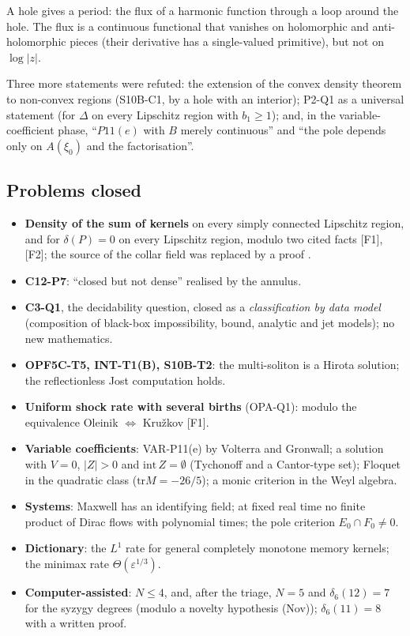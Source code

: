 \begin{intuition}
A hole gives a period: the flux of a harmonic function through a loop around the hole. The flux is a continuous functional that vanishes on holomorphic and anti-holomorphic pieces (their derivative has a single-valued primitive), but not on $\log|z|$.
\end{intuition}

Three more statements were refuted: the extension of the convex density theorem to non-convex regions (S10B-C1, by a hole with an interior); P2-Q1 as a universal statement (for $\Delta$ on every Lipschitz region with $b_1\ge1$); and, in the variable-coefficient phase, ``$P11(e)$ with $B$ merely continuous'' and ``the pole depends only on $A(\xi_0)$ and the factorisation''.

\subsection{Problems closed}

\begin{itemize}
\item \textbf{Density of the sum of kernels} on every simply connected Lipschitz region, and for $\delta(P)=0$ on every Lipschitz region, modulo two cited facts [F1], [F2]; the source of the collar field was replaced by a proof .
\item \textbf{C12-P7}: ``closed but not dense'' realised by the annulus.
\item \textbf{C3-Q1}, the decidability question, closed as a \emph{classification by data model} (composition of black-box impossibility, bound, analytic and jet models); no new mathematics.
\item \textbf{OPF5C-T5, INT-T1(B), S10B-T2}: the multi-soliton is a Hirota solution; the reflectionless Jost computation holds.
\item \textbf{Uniform shock rate with several births} (OPA-Q1): modulo the equivalence Oleinik $\Leftrightarrow$ Kru\v zkov [F1].
\item \textbf{Variable coefficients}: VAR-P11(e) by Volterra and Gronwall; a solution with $V=0$, $|Z|>0$ and $\mathrm{int}\,Z=\emptyset$ (Tychonoff and a Cantor-type set); Floquet in the quadratic class ($\mathrm{tr}M=-26/5$); a monic criterion in the Weyl algebra.
\item \textbf{Systems}: Maxwell has an identifying field; at fixed real time no finite product of Dirac flows with polynomial times; the pole criterion $E_0\cap F_0\ne0$.
\item \textbf{Dictionary}: the $L^1$ rate for general completely monotone memory kernels; the minimax rate $\Theta(\varepsilon^{1/3})$.
\item \textbf{Computer-assisted}: $N\le4$, and, after the triage, $N=5$ and $\delta_6(12)=7$ for the syzygy degrees (modulo a novelty hypothesis (Nov)); $\delta_6(11)=8$ with a written proof.
\end{itemize}

